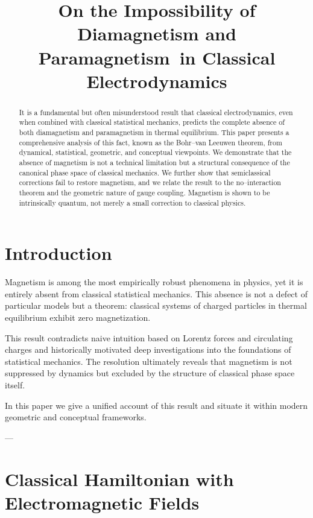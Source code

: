 \documentclass[11pt]{article}
\title{\textbf{On the Impossibility of Diamagnetism and Paramagnetism\
in Classical Electrodynamics}}
\author{ }
\date{}
\begin{document}
\maketitle

\begin{abstract}
It is a fundamental but often misunderstood result that classical electrodynamics, even when combined with classical statistical mechanics, predicts the complete absence of both diamagnetism and paramagnetism in thermal equilibrium. This paper presents a comprehensive analysis of this fact, known as the Bohr--van Leeuwen theorem, from dynamical, statistical, geometric, and conceptual viewpoints. We demonstrate that the absence of magnetism is not a technical limitation but a structural consequence of the canonical phase space of classical mechanics. We further show that semiclassical corrections fail to restore magnetism, and we relate the result to the no--interaction theorem and the geometric nature of gauge coupling. Magnetism is shown to be intrinsically quantum, not merely a small correction to classical physics.
\end{abstract}

\tableofcontents

\section{Introduction}

Magnetism is among the most empirically robust phenomena in physics, yet it is entirely absent from classical statistical mechanics. This absence is not a defect of particular models but a theorem: classical systems of charged particles in thermal equilibrium exhibit zero magnetization.

This result contradicts naive intuition based on Lorentz forces and circulating charges and historically motivated deep investigations into the foundations of statistical mechanics. The resolution ultimately reveals that magnetism is not suppressed by dynamics but excluded by the structure of classical phase space itself.

In this paper we give a unified account of this result and situate it within modern geometric and conceptual frameworks.

---

\section{Classical Hamiltonian with Electromagnetic Fields}
\end{document}
